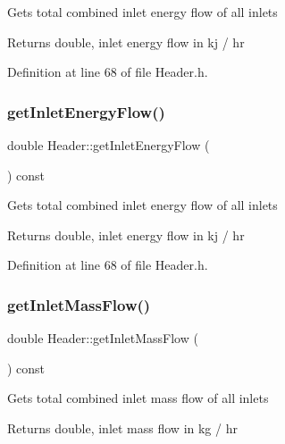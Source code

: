 Gets total combined inlet energy flow of all inlets \begin{DoxyReturn}{Returns}
double, inlet energy flow in kj / hr 
\end{DoxyReturn}


Definition at line 68 of file Header.\+h.

\mbox{\label{class_header_a2a30ee96fa76bab1533cb9ceea0c8af3}} 
\subsubsection{\texorpdfstring{get\+Inlet\+Energy\+Flow()}{getInletEnergyFlow()}\hspace{0.1cm}{\footnotesize\ttfamily [3/3]}}
{\footnotesize\ttfamily double Header\+::get\+Inlet\+Energy\+Flow (\begin{DoxyParamCaption}{ }\end{DoxyParamCaption}) const\hspace{0.3cm}{\ttfamily [inline]}}

Gets total combined inlet energy flow of all inlets \begin{DoxyReturn}{Returns}
double, inlet energy flow in kj / hr 
\end{DoxyReturn}


Definition at line 68 of file Header.\+h.

\mbox{\label{class_header_ad572e6144481b9e9f65004aacebd701c}} 
\subsubsection{\texorpdfstring{get\+Inlet\+Mass\+Flow()}{getInletMassFlow()}\hspace{0.1cm}{\footnotesize\ttfamily [1/3]}}
{\footnotesize\ttfamily double Header\+::get\+Inlet\+Mass\+Flow (\begin{DoxyParamCaption}{ }\end{DoxyParamCaption}) const\hspace{0.3cm}{\ttfamily [inline]}}

Gets total combined inlet mass flow of all inlets \begin{DoxyReturn}{Returns}
double, inlet mass flow in kg / hr 
\end{DoxyReturn}


